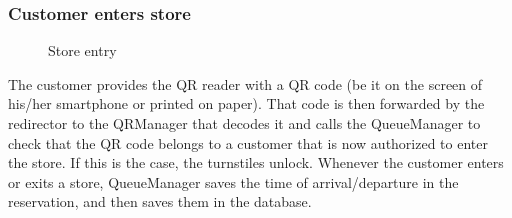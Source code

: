 \subsubsection{Customer enters store}
\begin{figure}[H]
	\noindent
	\caption{Store entry}
\end{figure}
The customer provides the QR reader with a QR code (be it on the screen of his/her smartphone or printed on paper). That code is then forwarded by the redirector to the QRManager that decodes it and calls the QueueManager to check that the QR code belongs to a customer that is now authorized to enter the store. If this is the case, the turnstiles unlock. Whenever the customer enters or exits a store, QueueManager saves the time of arrival/departure in the reservation, and then saves them in the database.
